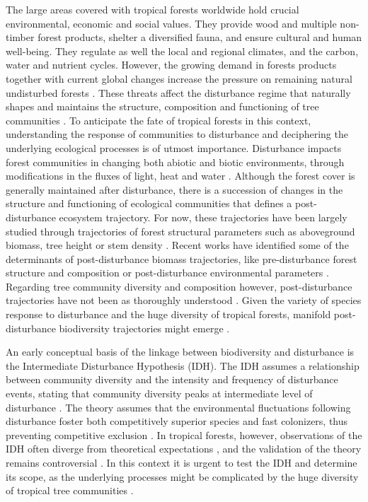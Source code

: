 \documentclass[fleqn,10pt]{ArtEcoFoG} %
\begin{document}
The large areas covered with tropical forests worldwide hold crucial
environmental, economic and social values. They provide wood and
multiple non-timber forest products, shelter a diversified fauna, and
ensure cultural and human well-being. They regulate as well the local
and regional climates, and the carbon, water and nutrient cycles.
However, the growing demand in forests products together with current
global changes increase the pressure on remaining natural undisturbed
forests \citep{Morales-Hidalgo2015}. These threats affect the
disturbance regime that naturally shapes and maintains the structure,
composition and functioning of tree communities
\citep{Schnitzer2001, Anderson-Teixeira2013, Sist2015}. To anticipate
the fate of tropical forests in this context, understanding the response
of communities to disturbance and deciphering the underlying ecological
processes is of utmost importance. Disturbance impacts forest
communities in changing both abiotic and biotic environments, through
modifications in the fluxes of light, heat and water
\citep{Goulamoussene2017}. Although the forest cover is generally
maintained after disturbance, there is a succession of changes in the
structure and functioning of ecological communities that defines a
post-disturbance ecosystem trajectory. For now, these trajectories have
been largely studied through trajectories of forest structural
parameters such as aboveground biomass, tree height or stem density
\citep{Piponiot2016, Rutishauser2016}. Recent works have identified some
of the determinants of post-disturbance biomass trajectories, like
pre-disturbance forest structure and composition or post-disturbance
environmental parameters \citep{Herault2018}. Regarding tree community
diversity and composition however, post-disturbance trajectories have
not been as thoroughly understood \citep{Guitet2018, Molino2001}. Given
the variety of species response to disturbance and the huge diversity of
tropical forests, manifold post-disturbance biodiversity trajectories
might emerge \citep{Lindenmayer2012, Garcia_florez2017}.

An early conceptual basis of the linkage between biodiversity and
disturbance is the Intermediate Disturbance Hypothesis (IDH). The IDH
assumes a relationship between community diversity and the intensity and
frequency of disturbance events, stating that community diversity peaks
at intermediate level of disturbance \citep{Connell1978}. The theory
assumes that the environmental fluctuations following disturbance foster
both competitively superior species and fast colonizers, thus preventing
competitive exclusion \citep{Shea2004, Pulsford2016}. In tropical
forests, however, observations of the IDH often diverge from theoretical
expectations \citep{Hugues2007, Sheil2003, Norden2017}, and the
validation of the theory remains controversial
\citep{Hubbell2001, Fox2013, Sheil2013}. In this context it is urgent to
test the IDH and determine its scope, as the underlying processes might
be complicated by the huge diversity of tropical tree communities
\citep{Lindenmayer2012, Garcia_florez2017}.
\end{document}
